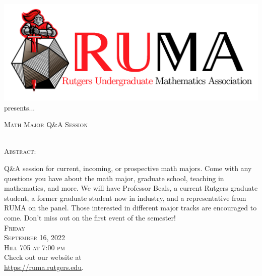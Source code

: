 \documentclass[12pt]{article}
\begin{document}

\begin{center}\includegraphics[scale=.4]{RUMAlogo.png}\\
\large  presents... \\

\vspace{2mm}
\begin{spacing}{1}
{\fontsize{35}{44}\selectfont  \textsc{
Math Major Q\&A Session}} \end{spacing}
 

 ~~\\

\normalsize
\textsc{Abstract:}

\Large 
Q\&A session for current, incoming, or prospective math
majors. Come with any questions you have about the math
major, graduate school, teaching in mathematics, and more. We will
have Professor Beals, a current Rutgers graduate student, a former
graduate student now in industry, and a representative from RUMA on the
panel. Those interested in different major tracks are encouraged
to come. Don't miss out on the first event of the semester!\\

\vspace{2.5mm} 
\huge   \textsc{Friday\\September 16, 2022 \\Hill 705 at 7:00 pm} \\
\vspace{2.5mm}
\Large  Check out our website at \\
\url{https://ruma.rutgers.edu}.
\end{center}
\end{document}
